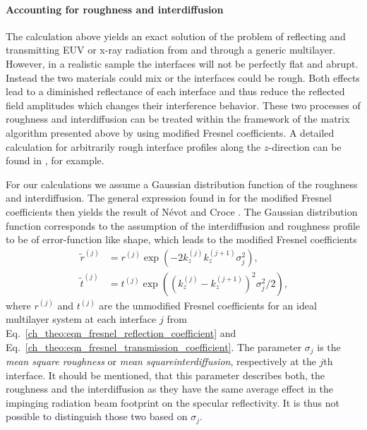 \paragraph{Accounting for roughness and interdiffusion}
The calculation above yields an exact solution of the problem of reflecting and transmitting EUV or x-ray radiation from and through a generic multilayer. However, in a realistic sample the interfaces will not be perfectly flat and abrupt. Instead the two materials could mix or the interfaces could be rough. Both effects lead to a diminished reflectance of each interface and thus reduce the reflected field amplitudes which changes their interference behavior. These two processes of roughness and interdiffusion can be treated within the framework of the matrix algorithm presented above by using modified Fresnel coefficients. A detailed calculation for arbitrarily rough interface profiles along the $z$-direction can be found in \cite{vidal_metallic_1984}, for example.

For our calculations we assume a Gaussian distribution function of the roughness and interdiffusion. The general expression found in \cite{vidal_metallic_1984} for the modified Fresnel coefficients then yields the result of N\'{e}vot and Croce \cite{croce_p._etude_1976, nevot_l._caracterisation_1980}. The Gaussian distribution function corresponds to the assumption of the interdiffusion and roughness profile to be of error-function like shape, which leads to the modified Fresnel coefficients
\begin{align}
       \tilde{r}^{(j)} &= r^{(j)} \exp(-2 k_z^{(j)} k_z^{(j+1)} 
\sigma_j^2)\text{,} \nonumber \\
       \tilde{t}^{(j)} &= t^{(j)} \exp((k_z^{(j)} - k_z^{(j+1)})^2 \sigma_j^2/2) 
\text{,} \label{eqn:mod_fresnel}
\end{align}
where $r^{(j)}$ and $t^{(j)}$ are the unmodified Fresnel coefficients for an ideal multilayer system at each interface $j$ from Eq.~\eqref{ch_theo:eqn_fresnel_reflection_coefficient} and Eq.~\eqref{ch_theo:eqn_fresnel_transmission_coefficient}. The parameter $\sigma_j$ is the \emph{mean square roughness} or \emph{mean squareinterdiffusion}, respectively at the $j$th interface. It should be mentioned, that this parameter describes both, the roughness and the interdiffusion as they have the same average effect in the impinging radiation beam footprint on the specular reflectivity. It is thus not possible to distinguish those two based on $\sigma_j$.

